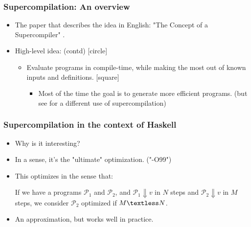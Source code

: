 \documentclass{beamer}
\begin{document}
\begin{frame}
    \frametitle{Supercompilation: An overview}

    \begin{itemize}
        \item
            The paper that describes the idea in English: "The Concept of a
            Supercompiler" \citet{Turchin86theconcept}.
        \item
            High-level idea: (contd)
            [circle]
            \begin{itemize}
                \item
                    Evaluate programs in compile-time, while making the most out
                    of known inputs and definitions.
                    [square]
                    \begin{itemize}[<+->]
                        \item
                            Most of the time the goal is to generate more
                            efficient programs. \newline
                            (but see \citet{Klyuchnikov2010proving} for a
                            different use of supercompilation)
                    \end{itemize}
            \end{itemize}
    \end{itemize}
\end{frame}


\begin{frame}
    \frametitle{Supercompilation in the context of Haskell}

    \begin{itemize}
        \item
            Why is it interesting?
        \item
            In a sense, it's the "ultimate" optimization. ("-O99")
        \item
            This optimizes in the sense that:

            If we have a programs $\mathcal{P}_1$ and $\mathcal{P}_2$, and
            \newline
            $\mathcal{P}_1 \Downarrow v$ in $N$ steps and \newline
            $\mathcal{P}_2 \Downarrow v$ in $M$ steps, \newline
            we consider $\mathcal{P}_2$ optimized if $M \textless N$.
        \item
            An approximation, but works well in practice.
    \end{itemize}
\end{frame}
\end{document}
